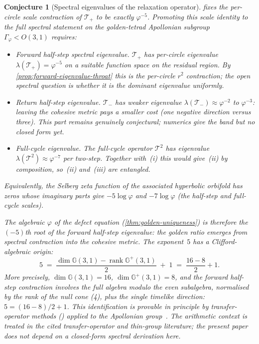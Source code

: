 \documentclass[11pt,a4paper]{article}
\theoremstyle{plain}
\newtheorem{conjecture}[theorem]{Conjecture}
\theoremstyle{definition}
\theoremstyle{remark}
\numberwithin{equation}{section}
\newcommand{\Cl}{\mathbb{G}}
\newcommand{\vp}{\varphi}
\begin{document}
\begin{conjecture}[Spectral eigenvalues of the relaxation operator]
\label{conj:phi5-relaxation}
 fixes the per-circle scale
contraction of \(\mathcal{T}_{+}\) to be exactly \(\vp^{-5}\).
Promoting this scale identity to the full spectral statement on the
golden-tetrad Apollonian subgroup \(\Gamma_\vp<O(3,1)\) requires:
\begin{itemize}
\item[(i)] \emph{Forward half-step spectral eigenvalue.}
  \(\mathcal{T}_{+}\) has per-circle eigenvalue
  \(\lambda(\mathcal{T}_{+})=\vp^{-5}\) on a suitable function space
  on the residual region.  By \cref{prop:forward-eigenvalue-throat}
  this is the per-circle \(r^2\) contraction; the open spectral
  question is whether it is the dominant eigenvalue uniformly.
\item[(ii)] \emph{Return half-step eigenvalue.}
  \(\mathcal{T}_{-}\) has weaker eigenvalue
  \(\lambda(\mathcal{T}_{-})\approx\vp^{-2}\) to \(\vp^{-3}\): leaving
  the cohesive metric pays a smaller cost (one negative direction
  versus three).  This part remains genuinely conjectural; numerics
  give the band but no closed form yet.
\item[(iii)] \emph{Full-cycle eigenvalue.}
  The full-cycle operator \(\mathcal{T}^{2}\) has eigenvalue
  \(\lambda(\mathcal{T}^{2})\approx\vp^{-7}\) per two-step.  Together
  with~(i) this would give~(ii) by composition, so~(ii) and~(iii)
  are entangled.
\end{itemize}
Equivalently, the Selberg zeta function of the associated hyperbolic
orbifold has zeros whose imaginary parts give \(-5\log\vp\) and
\(-7\log\vp\) (the half-step and full-cycle scales).

The algebraic \(\vp\) of the defect equation
(\cref{thm:golden-uniqueness}) is therefore the \((-5)\)th root of the
forward half-step eigenvalue: the golden ratio emerges from spectral
contraction \emph{into} the cohesive metric.  The exponent~\(5\) has a
Clifford-algebraic origin:
\[
  5 \;=\; \frac{\dim\Cl(3,1) - \operatorname{rank}\Cl^+(3,1)}{2}
    \;+\; 1
    \;=\; \frac{16-8}{2}+1.
\]
More precisely, \(\dim\Cl(3,1)=16\), \(\dim\Cl^+(3,1)=8\), and the
forward half-step contraction involves the full algebra modulo the
even subalgebra, normalised by the rank of the null cone (4), plus the
single timelike direction: \(5=(16-8)/2+1\).  This identification is
provable in principle by transfer-operator methods
(\cite{mayer1991,pollicott-sharp}) applied to the Apollonian
group~\cite{bourgain2010,kontorovich-oh}.  The arithmetic context is
treated in the cited transfer-operator and thin-group literature; the
present paper does not depend on a closed-form spectral derivation
here.


\end{conjecture}
\end{document}
